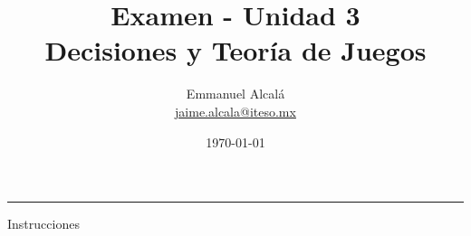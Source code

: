 \documentclass[12pt]{scrartcl} %
\title{Examen - Unidad 3 \\ \normalsize Decisiones y Teoría de Juegos}
\author{Emmanuel Alcalá\\ \url{jaime.alcala@iteso.mx}}
\date{\today}
\begin{document}
\maketitle
\hrule

\begin{summarybox}{Instrucciones}

    

\end{summarybox}
\end{document}
